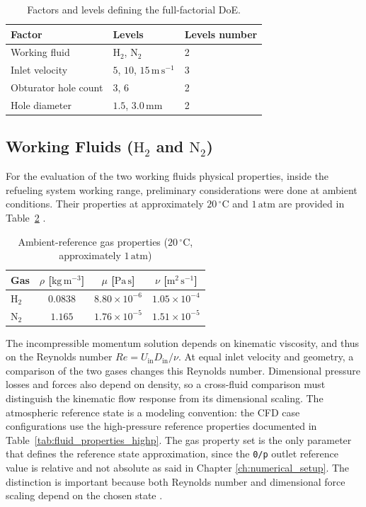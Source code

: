 \begin{table}[htbp]
\centering
\begin{tabular}{@{}lll@{}}
\toprule
\textbf{Factor} & \textbf{Levels} & \textbf{Levels number}\\
\midrule
Working fluid & $\mathrm{H}_2$, $\mathrm{N}_2$ & 2\\
Inlet velocity & $5$, $10$, $15\,\mathrm{m\,s^{-1}}$ & 3\\
Obturator hole count & 3, 6 & 2\\
Hole diameter & $1.5$, $3.0\,\mathrm{mm}$ & 2\\
\bottomrule
\end{tabular}
\caption{Factors and levels defining the full-factorial DoE.}
\label{tab:doe_factors}

\end{table}

\subsection{Working Fluids ($\mathrm{H}_2$ and $\mathrm{N}_2$)}
For the evaluation of the two working fluids physical properties, inside the refueling system working range, preliminary considerations were done at ambient conditions. Their properties at approximately $20\,^{\circ}\mathrm{C}$ and $1\,\mathrm{atm}$ are provided in Table~\ref{tab:fluid_properties} \cite{nist_refprop}. 

\begin{table}[htbp]
\centering
\small
\begin{tabular}{@{}lccc@{}}
\toprule
\textbf{Gas} & $\rho$ [$\mathrm{kg\,m^{-3}}$] & $\mu$ [$\mathrm{Pa\,s}$] & $\nu$ [$\mathrm{m^2\,s^{-1}}$]\\
\midrule
$\mathrm{H}_2$ & $0.0838$ & $8.80\times10^{-6}$ & $1.05\times10^{-4}$\\
$\mathrm{N}_2$ & $1.165$ & $1.76\times10^{-5}$ & $1.51\times10^{-5}$\\
\bottomrule
\end{tabular}
\caption{Ambient-reference gas properties ($20\,^{\circ}\mathrm{C}$, approximately $1\,\mathrm{atm}$) }
\label{tab:fluid_properties}

\end{table}

The incompressible momentum solution depends on kinematic viscosity, and thus on the Reynolds number $Re=U_{\mathrm{in}}D_{\mathrm{in}}/\nu$. At equal inlet velocity and geometry, a comparison of the two gases changes this Reynolds number. Dimensional pressure losses and forces also depend on density, so a cross-fluid comparison must distinguish the kinematic flow response from its dimensional scaling. The atmospheric reference state is a modeling convention: the CFD case configurations use the high-pressure reference properties documented in Table~\ref{tab:fluid_properties_highp}.
The gas property set is the only parameter that defines the reference state approximation, since the \texttt{0/p} outlet reference value is relative and not absolute as said in Chapter \ref{ch:numerical_setup}. The distinction is important because both Reynolds number and dimensional force scaling depend on the chosen state \cite{sae_j2601,nist_refprop}.

